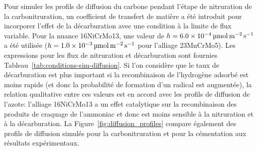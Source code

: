 Pour simuler les profils de diffusion du carbone pendant l'étape de nitruration de la carbonitruration, un coefficient de transfert de matière a été introduit pour incorporer l'effet de la décarburation avec une condition à la limite de flux variable. Pour la nuance 16NiCrMo13, une valeur de $h=\SI{6,0E-4}{\micro\mole\per\square\metre\per\second}$ a été utilisée ($h=\SI{1,0E-03}{\micro\mole\per\square\metre\per\second}$ pour l'alliage 23MnCrMo5). Les expressions pour les flux de nitruration et décarburation sont fournies Tableau~\ref{tab:conditions-sim-diffusion}. Si l'on considère que le taux de décarburation est plus important si la recombinaison de l'hydrogène adsorbé est moins rapide (et donc la probabilité de formation d'un radical  est augmentée), la relation qualitative entre ces valeurs est en accord avec les profils de diffusion de l'azote: l'alliage 16NiCrMo13 a un effet catalytique sur la recombinaison des produits de craquage de l'ammoniac et donc est moins sensible à la nitruration et à la décarburation. La Figure~\ref{fig:diffusion_profiles} compare également des profils de diffusion simulés pour la carbonitruration et pour la cémentation aux résultats expérimentaux.

\clearpage

